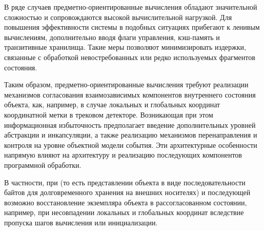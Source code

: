 В ряде случаев предметно-ориентированные вычисления обладают значительной
сложностью и сопровождаются высокой вычислительной нагрузкой. Для повышения
эффективности системы в подобных ситуациях прибегают к ленивым вычислениям,
дополнительно вводя флаги управления, кэш-память и транзитивные хранилища.
Такие меры позволяют минимизировать издержки, связанные с обработкой
невостребованных или редко используемых фрагментов состояния.

Таким образом, предметно-ориентированные вычисления требуют реализации
механизмов согласования взаимозависимых компонентов внутреннего состояния
объекта, как, например, в случае локальных и глобальных координат координатной
метки в трековом детекторе. Возникающая при этом информационная избыточность
предполагает введение дополнительных уровней абстракции и инкапсуляции,
а также реализацию механизмов перенаправления и контроля на уровне
объектной модели события. Эти архитектурные особенности напрямую влияют
на архитектуру и реализацию последующих компонентов программной обработки.

В частности, при  (то есть представлении объекта в виде
последовательности байтов для долговременного хранения на внешних носителях)
и последующей  возможно восстановление экземпляра объекта
в рассогласованном состоянии, например, при несовпадении локальных и
глобальных координат вследствие пропуска шагов вычисления или инициализации.

